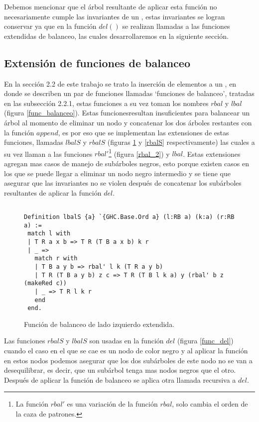 Debemos mencionar que el \'arbol resultante de aplicar esta funci\'on no necesariamente cumple las
invariantes de un {\arn}, estas invariantes se logran conservar ya que en la funci\'on $del()$ se
realizan llamadas a las funciones extendidas de balanceo, las cuales desarrollaremos en la
siguiente sección.

\subsection{Extensi\'on de funciones de balanceo}

En la secci\'on 2.2 de este trabajo se trato la inserci\'on de elementos a un {\arn}, en donde se
describen un par de funciones llamadas `funciones de balanceo', tratadas en las subsecci\'on
2.2.1, estas funciones a su vez toman los nombres $rbal$ y $lbal$ (figura \ref{func_balanceo}).
Estas funcionesresultan insuficientes para balancear un \'arbol al momento de eliminar un nodo y
concatenar los dos \'arboles restantes con la función $append$, es por eso que se implementan las
extensiones de estas funciones, llamadas $lbalS$ y $rbalS$ (figuras \ref{lbalS} y \ref{rbalS}
respectivamente) las cuales a su vez llaman a las funciones $rbal'$\footnote{La funci\'on $rbal'$
es una variación de la función $rbal$, solo cambia el orden de la caza de patrones.} (figura
\ref{rbal_2}) y $lbal$. Estas extensiones agregan mas casos de manejo de subárboles negros, esto
porque existen casos en los que se puede llegar a eliminar un nodo negro intermedio y se tiene que
asegurar que las invariantes no se violen después de concatenar los subárboles resultantes de
aplicar la función $del$.

\begin{figure}
\centering
\captionsetup{justification=centering}
\begin{verbatim}

Definition lbalS {a} `{GHC.Base.Ord a} (l:RB a) (k:a) (r:RB a) :=
 match l with
 | T R a x b => T R (T B a x b) k r
 | _ =>
   match r with
   | T B a y b => rbal' l k (T R a y b)
   | T R (T B a y b) z c => T R (T B l k a) y (rbal' b z (makeRed c))
   | _ => T R l k r
   end
 end.

\end{verbatim}
\caption{Funci\'on de balanceo de lado izquierdo extendida.}
\label{lbalS}
\end{figure}

Las funciones $rbalS$ y $lbalS$ son usadas en la funci\'on $del$ (figura \ref{func_del}) cuando el
caso en el que se cae es un nodo de color negro y al aplicar la funci\'on en estos nodos podemos
asegurar que los dos subárboles de este nodo no se van a desequilibrar, es decir, que un subárbol
tenga mas nodos negros que el otro. Después de aplicar la función de balanceo se aplica otra llamada
recursiva a $del$.


